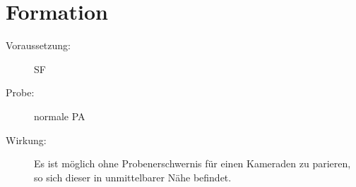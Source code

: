 \section{Formation}
\label{bPA.formation}
\begin{description}
    \item[Voraussetzung:]
        SF 
    \item[Probe:]
        normale PA
    \item[Wirkung:]
        Es ist möglich ohne Probenerschwernis für einen Kameraden zu parieren, so sich dieser in unmittelbarer Nähe befindet.
\end{description}
